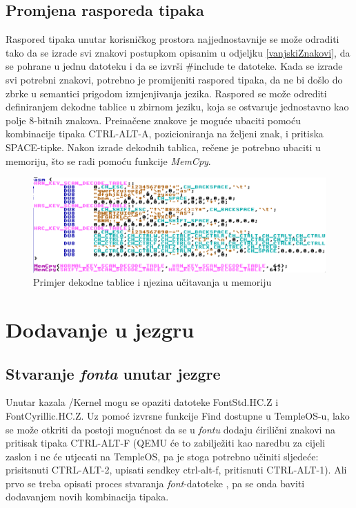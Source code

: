 \documentclass{foi}
\begin{document}
\subsection{Promjena rasporeda tipaka}

Raspored tipaka unutar korisničkog prostora najjednostavnije se može odraditi tako da se izrade svi znakovi postupkom opisanim u odjeljku \ref{vanjskiZnakovi}, da se pohrane u jednu datoteku i da se izvrši {\selectfont \#include} te datoteke. Kada se izrade svi potrebni znakovi, potrebno je promijeniti raspored tipaka, da ne bi došlo do zbrke u semantici prigodom izmjenjivanja jezika. Raspored se može odrediti definiranjem dekodne tablice u zbirnom jeziku, koja se ostvaruje jednostavno kao polje 8-bitnih znakova. Preinačene znakove je moguće ubaciti pomoću kombinacije tipaka {\selectfont CTRL-ALT-A}, pozicioniranja na željeni znak, i pritiska {\selectfont SPACE}-tipke. Nakon izrade dekodnih tablica, rečene je potrebno ubaciti u memoriju, što se radi pomoću funkcije \emph{MemCpy}.

\begin{figure}[H]
    \centering
    \includegraphics[width=1.0\textwidth]{slike/user_layout.png}
    \caption{Primjer dekodne tablice i njezina učitavanja u memoriju}
    \label{fig:user_layout}
\end{figure}

\section{Dodavanje u jezgru}

\subsection{Stvaranje \emph{fonta} unutar jezgre\label{kreiranjeFontaJezgra}}

Unutar kazala {\selectfont /Kernel} mogu se opaziti datoteke {\selectfont FontStd.HC.Z} i {\selectfont FontCyrilli\-c.HC.Z}. Uz pomoć izvrsne funkcije {\selectfont Find} dostupne u TempleOS-u, lako se može otkriti da postoji mogućnost da se u \emph{fontu} dodaju ćirilični znakovi na pritisak tipaka {\selectfont CTRL-ALT-F} (QEMU će to zabilježiti kao naredbu za cijeli zaslon i ne će utjecati na TempleOS, pa je stoga potrebno učiniti sljedeće: prisitsnuti {\selectfont CTRL-ALT-2}, upisati {\selectfont sendkey ctrl-alt-f}, pritisnuti {\selectfont CTRL-ALT-1}). Ali prvo se treba opisati proces stvaranja \emph{font}-datoteke , pa se onda baviti dodavanjem novih kombinacija tipaka.
\end{document}
